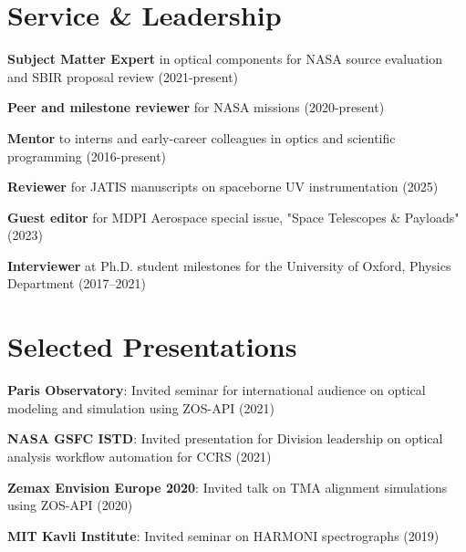 \documentclass[letterpaper,11pt]{article}
\begin{document}
\section{Service \& Leadership}
\begin{itemize}[leftmargin=0.15in, label={}, noitemsep, topsep=0pt]
    \small{
        \item{\textbf{Subject Matter Expert}{ in optical components for NASA source evaluation and SBIR proposal review (2021-present)}}
        \item{\textbf{Peer and milestone reviewer}{ for NASA missions (2020-present)}}
        \item{\textbf{Mentor}{ to interns and early-career colleagues in optics and scientific programming (2016-present)}}
        \item{\textbf{Reviewer}{ for JATIS manuscripts on spaceborne UV instrumentation (2025)}}
        \item{\textbf{Guest editor}{ for MDPI Aerospace special issue, "Space Telescopes \& Payloads" (2023)}}
        \item{\textbf{Interviewer}{ at Ph.D. student milestones for the University of Oxford, Physics Department (2017–2021)}}
    }
\end{itemize}

\section{Selected Presentations}
\begin{itemize}[leftmargin=0.15in, label={}, noitemsep, topsep=0pt]
    \small{
        \item{\textbf{Paris Observatory}{: Invited seminar for international audience on optical modeling and simulation using ZOS-API (2021)}}
        \item{\textbf{NASA GSFC ISTD}{: Invited presentation for Division leadership on optical analysis workflow automation for CCRS (2021)}}
        \item{\textbf{Zemax Envision Europe 2020}{: Invited talk on TMA alignment simulations using ZOS-API (2020)}}
        \item{\textbf{MIT Kavli Institute}{: Invited seminar on HARMONI spectrographs (2019)}}
    }
\end{itemize}

\end{document}
